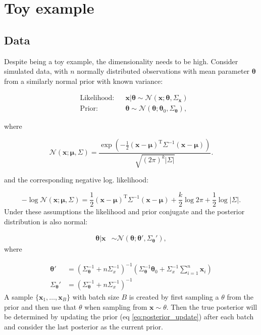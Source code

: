 \section{Toy example}

\subsection{Data}

Despite being a toy example, the dimensionality needs to be high. Consider simulated data, with $n$ normally distributed observations with mean parameter $\bm{\theta}$ from a similarly normal prior with known variance:

\begin{align}
  &\text{Likelihood:} &&\bm{x} | \bm{\theta} \sim \mathcal{N}(\bm{x}; \bm{\theta}, \Sigma_{\bm{x}})  \nonumber \\
  &\text{Prior:} &&\bm{\theta} \sim \mathcal{N}(\bm{\theta}; \bm{\theta}_0, \Sigma_{\bm{\theta}}),
\end{align}

where

\begin{equation}
  \mathcal{N} \left( \bm{x}; \bm{\mu}, \Sigma \right) = \frac{ \exp \left( -\frac{ 1 }{ 2 } ( \bm {x} - \bm{\mu} )^{ \mathrm {T} }{ \Sigma }^{-1} ( \bm{x} - \bm{\mu} ) \right)} { \sqrt{ ( 2\pi )^{k} | \Sigma | } }.
\end{equation}

and the corresponding negative log. likelihood:

\begin{equation}
  -\log \mathcal{N} \left( \bm{x}; \bm{\mu}, \Sigma \right) = \frac{ 1 }{ 2 } ( \bm {x} - \bm{\mu} )^{ \mathrm {T} }{ \Sigma }^{-1} ( \bm{x} - \bm{\mu} ) + \frac{k}{2} \log 2\pi  + \frac{1}{2} \log | \Sigma | .
\end{equation}
Under these assumptions the likelihood and prior conjugate and the posterior distribution is also normal:

\begin{align}
  \bm{\theta}|\bm{x} &\sim \mathcal{N}(\bm{\theta}; \bm{\theta}', \Sigma_{\bm{\theta}}') \nonumber,
\end{align}
where

\begin{align}
  \bm{\theta}' &= \left( \Sigma_{\bm{\theta}}^{-1} + n \Sigma_x^{-1}\right)^{-1} \left( \Sigma_{\bm{\theta}}^{-1} \bm{\theta}_{0} + \Sigma_x^{-1} \sum_{i=1}^{n} \bm{x}_{i} \right) \nonumber \\
  \Sigma_{\bm{\theta}}' &=\left( \Sigma_{\bm{\theta}}^{-1} + n \Sigma_x^{-1}\right)^{-1}
  \label{eq:posterior_update}
\end{align}
A sample $\{\bm{x}_1, \dots, \bm{x}_B \}$ with batch size $B$ is created by first sampling a $\theta$ from the prior and then use that $\theta$ when sampling from $ \bm{x} \sim \theta $.
Then the true posterior will be determined by updating the prior (eq \eqref{eq:posterior_update}) after each batch and consider the last posterior as the current prior.

